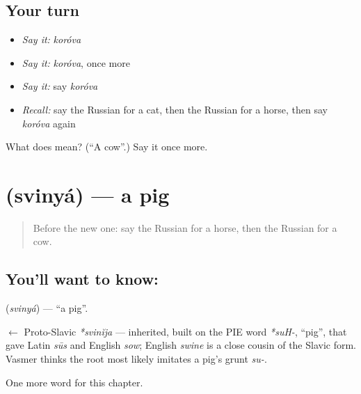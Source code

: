 \subsection*{Your turn}
\begin{itemize}
\raggedright
  \item \emph{Say it:} \emph{koróva}
  \item \emph{Say it:} \emph{koróva}, once more
  \item \emph{Say it:} say \emph{koróva}
  \item \emph{Recall:} say the Russian for a cat, then the Russian for a horse, then say \emph{koróva} again
\end{itemize}

\begin{tcolorbox}[breakable,colback=teal!4,colframe=teal!35!black,title={Before you move on}]
What does  mean? (\textquotedblleft{}A cow\textquotedblright{}.) Say it once more.
\end{tcolorbox}
\section[\texorpdfstring{\ru{свинья} (svinyá)}{свинья (svinyá)}]{ (svinyá) — a pig}

\label{lesson:RU-C60-pig}



\begin{quote}
Before the new one: say the Russian for a horse, then the Russian for a cow.
\end{quote}

\subsection*{You'll want to know: }
\textbf{} (\emph{svinyá}) — \textquotedblleft{}a pig\textquotedblright{}.

\begin{cousinweb}
\textbf{} $\leftarrow$ Proto-Slavic \emph{*svinĭja} — inherited, built on the PIE word \emph{*suH-}, \textquotedblleft{}pig\textquotedblright{}, that gave Latin \emph{sūs} and English \emph{sow}; English \emph{swine} is a close cousin of the Slavic form. Vasmer thinks the root most likely imitates a pig's grunt \emph{su-}.
\end{cousinweb}

\begin{grammarlens}[title={What you've built}]
One more word for this chapter.
\end{grammarlens}

